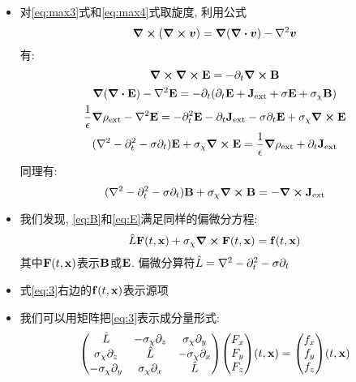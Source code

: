 \documentclass{beamer}
\begin{document}
\begin{frame}
  \begin{itemize}
  \item 对\eqref{eq:max3}式和\eqref{eq:max4}式取旋度, 利用公式
    \begin{equation}
      \curl (\curl \vb*{v}) = \grad(\div{\vb*{v}}) - \laplacian{\vb*{v}}
    \end{equation}
    有:
    \begin{gather}
      \curl{\curl{\vb{E}}} = - \partial_t \curl{\vb{B}} \notag \\
      \grad (\div{\vb{E}}) - \laplacian{\vb{E}} = - \partial_t (\partial_t \vb{E} + \vb{J}_{\text{ext}} + \sigma \vb{E} + \sigma_{\chi} \vb{B}) \notag \\
      \frac{1}{\epsilon}\grad\rho_{\text{ext}} - \laplacian \vb{E} = -\partial_t^2 \vb{E} -\partial_t \vb{J}_{\text{ext}} - \sigma \partial_t \vb{E} + \sigma_{\chi} \curl{\vb{E}} \notag \\
      (\laplacian - \partial_t^2 - \sigma \partial_t) \vb{E} + \sigma_{\chi} \curl{\vb{E}} = \frac{1}{\epsilon} \grad \rho_{\text{ext}} + \partial_t \vb{J}_{\text{ext}} \label{eq:B}
    \end{gather}
同理有:
\begin{equation}
  (\laplacian - \partial_t^2 - \sigma \partial_t) \vb{B} + \sigma_{\chi} \curl{\vb{B}} = - \curl{\vb{J}_{\text{ext}}} \label{eq:E}
\end{equation}
  \end{itemize}
\end{frame}

\begin{frame}
  \begin{itemize}
  \item 我们发现, \eqref{eq:B}和\eqref{eq:E}满足同样的偏微分方程:
    \begin{equation} \label{eq:3}
      \hat{L} \vb{F}(t, \vb{x}) + \sigma_{\chi} \curl{\vb{F}(t,\vb{x})} = \vb{f}(t,\vb{x})
    \end{equation}
    其中$\vb{F}(t,\vb{x})$表示$\vb{B}$或$\vb{E}$. 偏微分算符$\hat{L} = \laplacian - \partial_t^2 - \sigma \partial_t$
  \item 式\eqref{eq:3}右边的$\vb{f}(t, \vb{x})$表示源项
  \item 我们可以用矩阵把\eqref{eq:3}表示成分量形式:
    \begin{equation}
      \mqty(\hat{L} & -\sigma_{\chi}\partial_z & \sigma_{\chi}\partial_y \\
      \sigma_{\chi}\partial_z & \hat{L} & -\sigma_{\chi} \partial_x \\
      -\sigma_{\chi}\partial_y & \sigma_{\chi}\partial_x & \hat{L})
      \mqty(F_x \\ F_y \\ F_z) (t,\vb{x}) = \mqty(f_x \\ f_y \\ f_z)(t,\vb{x})
    \end{equation}
  \end{itemize}
\end{frame}
\end{document}
